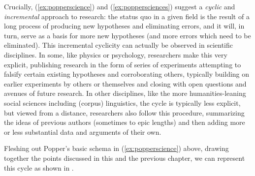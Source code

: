 Crucially, (\ref{ex:popperscience}) and (\ref{ex:poppersciences}) suggest a \emph{cyclic} and \emph{incremental} approach to research: the status quo in a given field is the result of a long process of producing new hypotheses  and eliminating errors, and it will, in turn, serve as a basis for more new hypotheses (and more errors which need to be eliminated). This incremental cyclicity can actually be observed in scientific disciplines. In some, like physics or psychology,  researchers make this very explicit, publishing research in the form of series of experiments  attempting to falsify  certain existing hypotheses and corroborating  others, typically building on earlier experiments by others or themselves and closing with open questions and avenues of future research. In other disciplines, like the more humanities\hyp{}leaning  social sciences including (corpus) linguistics, the cycle is typically less explicit, but viewed from a distance, researchers also follow this procedure, summarizing the ideas of previous authors (sometimes to epic lengths) and then adding more or less substantial data and arguments of their own.

Fleshing out Popper's basic schema in (\ref{ex:popperscience}) above, drawing together the points discussed in this and the previous chapter, we can represent this cycle as shown in .

